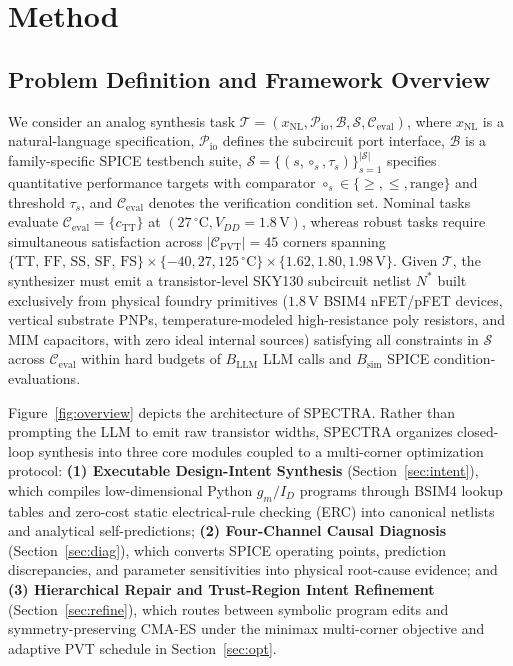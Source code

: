 \section{Method}
\label{sec:method}



\subsection{Problem Definition and Framework Overview}
\label{sec:formulation}
We consider an analog synthesis task $\mathcal{T} = (x_{\text{NL}}, \mathcal{P}_{\text{io}}, \mathcal{B}, \mathcal{S}, \mathcal{C}_{\text{eval}})$, where $x_{\text{NL}}$ is a natural-language specification, $\mathcal{P}_{\text{io}}$ defines the subcircuit port interface, $\mathcal{B}$ is a family-specific SPICE testbench suite, $\mathcal{S} = \{(s, \circ_s, \tau_s)\}_{s=1}^{|\mathcal{S}|}$ specifies quantitative performance targets with comparator $\circ_s \in \{\ge, \le, \text{range}\}$ and threshold $\tau_s$, and $\mathcal{C}_{\text{eval}}$ denotes the verification condition set. Nominal tasks evaluate $\mathcal{C}_{\text{eval}} = \{c_{\text{TT}}\}$ at $(27\,^\circ\mathrm{C}, V_{DD}=1.8\,\mathrm{V})$, whereas robust tasks require simultaneous satisfaction across $|\mathcal{C}_{\text{PVT}}| = 45$ corners spanning $\{\text{TT, FF, SS, SF, FS}\} \times \{-40, 27, 125\,^\circ\mathrm{C}\} \times \{1.62, 1.80, 1.98\,\mathrm{V}\}$. Given $\mathcal{T}$, the synthesizer must emit a transistor-level SKY130 subcircuit netlist $N^*$ built exclusively from physical foundry primitives ($1.8\,\mathrm{V}$ BSIM4 nFET/pFET devices, vertical substrate PNPs, temperature-modeled high-resistance poly resistors, and MIM capacitors, with zero ideal internal sources) satisfying all constraints in $\mathcal{S}$ across $\mathcal{C}_{\text{eval}}$ within hard budgets of $B_{\text{LLM}}$ LLM calls and $B_{\text{sim}}$ SPICE condition-evaluations.

Figure~\ref{fig:overview} depicts the architecture of \textsc{SPECTRA}. Rather than prompting the LLM to emit raw transistor widths, \textsc{SPECTRA} organizes closed-loop synthesis into three core modules coupled to a multi-corner optimization protocol: \textbf{(1) Executable Design-Intent Synthesis} (Section~\ref{sec:intent}), which compiles low-dimensional Python $g_m/I_D$ programs through BSIM4 lookup tables and zero-cost static electrical-rule checking (ERC) into canonical netlists and analytical self-predictions; \textbf{(2) Four-Channel Causal Diagnosis} (Section~\ref{sec:diag}), which converts SPICE operating points, prediction discrepancies, and parameter sensitivities into physical root-cause evidence; and \textbf{(3) Hierarchical Repair and Trust-Region Intent Refinement} (Section~\ref{sec:refine}), which routes between symbolic program edits and symmetry-preserving CMA-ES under the minimax multi-corner objective and adaptive PVT schedule in Section~\ref{sec:opt}.

